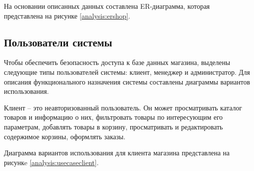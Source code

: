 На основании описанных данных составлена ER-диаграмма, которая представлена на рисунке \ref{analysis:ershop}.

\begin{figure}[H]
\end{figure}

\pagebreak

\subsection{Пользователи системы}

Чтобы обеспечить безопасность доступа к базе данных магазина, выделены следующие типы пользователей системы: клиент, менеджер и администратор. Для описания функционального назначения системы составлены диаграммы вариантов использования.

Клиент – это неавторизованный пользователь. Он может просматривать каталог товаров и информацию о них, фильтровать товары по интересующим его параметрам, добавлять товары в корзину, просматривать и редактировать содержимое корзины, оформлять заказы.

Диаграмма вариантов использования для клиента магазина представлена на рисункe \ref{analysis:usecaseclient}.


